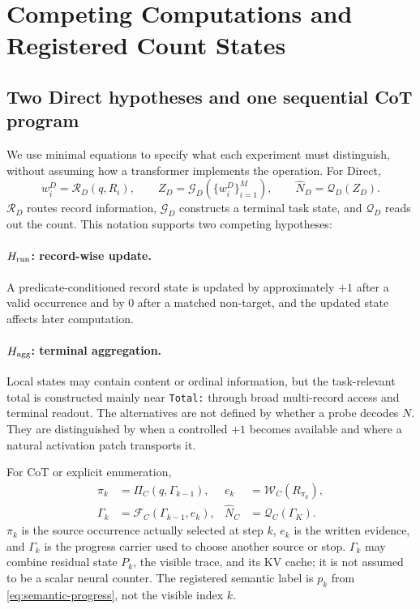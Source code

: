\section{Competing Computations and Registered Count States}
\label{sec:representations}

\subsection{Two Direct hypotheses and one sequential CoT program}

We use minimal equations to specify what each experiment must distinguish,
without assuming how a transformer implements the operation. For Direct,
\begin{equation}
  w_i^D=\mathcal R_D(q,R_i),\qquad
  Z_D=\mathcal G_D(\{w_i^D\}_{i=1}^{M}),\qquad
  \widehat N_D=\mathcal Q_D(Z_D).
\label{eq:direct-program}
\end{equation}
\(\mathcal R_D\) routes record information, \(\mathcal G_D\) constructs a
terminal task state, and \(\mathcal Q_D\) reads out the count. This notation
supports two competing hypotheses:
\paragraph{\(H_{\rm run}\): record-wise update.}
A predicate-conditioned record state is updated by approximately \(+1\) after
a valid occurrence and by \(0\) after a matched non-target, and the updated
state affects later computation.

\paragraph{\(H_{\rm agg}\): terminal aggregation.}
Local states may contain content or ordinal information, but the
task-relevant total is constructed mainly near \texttt{Total:} through broad
multi-record access and terminal readout.
The alternatives are not defined by whether a probe decodes \(N\). They are
distinguished by when a controlled \(+1\) becomes available and where a
natural activation patch transports it.

For CoT or explicit enumeration,
\begin{equation}
\begin{aligned}
  \pi_k &= \Pi_C(q,\Gamma_{k-1}),&
  e_k &= \mathcal W_C(R_{\pi_k}),\\
  \Gamma_k &= \mathcal F_C(\Gamma_{k-1},e_k),&
  \widehat N_C &= \mathcal Q_C(\Gamma_K).
\end{aligned}
\label{eq:cot-program}
\end{equation}
\(\pi_k\) is the source occurrence actually selected at step \(k\), \(e_k\)
is the written evidence, and \(\Gamma_k\) is the progress carrier used to
choose another source or stop. \(\Gamma_k\) may combine residual state
\(P_k\), the visible trace, and its KV cache; it is not assumed to be a scalar
neural counter. The registered semantic label is \(p_k\) from
\cref{eq:semantic-progress}, not the visible index \(k\).

